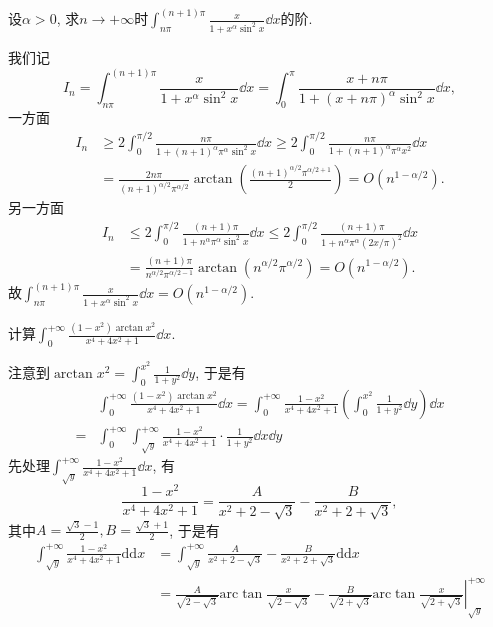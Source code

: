 \begin{quizb}
\woe 设\(\alpha>0\), 求\(n\rightarrow+\infty\)时\(\int_{n\pi}^{(n+1)\pi}\frac{x}{1+x^\alpha\sin^2x}\dd x\)的阶.
\begin{solution}
我们记\[I_n=\int_{n\pi}^{(n+1)\pi}\frac{x}{1+x^\alpha\sin^2x}\dd x=\int_{0}^{\pi}\frac{x+n\pi}{1+(x+n\pi)^\alpha\sin^2x}\dd x,\]一方面\[\begin{split}
I_n&\geqslant 2\int_{0}^{\pi/2}\frac{n\pi}{1+(n+1)^\alpha\pi^\alpha\sin^2x}\dd x\geqslant 2\int_{0}^{\pi/2}\frac{n\pi}{1+(n+1)^\alpha\pi^\alpha x^2}\dd x\\&=\frac{2n\pi}{(n+1)^{\alpha/2}\pi^{\alpha/2}}\arctan\left(\frac{(n+1)^{\alpha/2}\pi^{\alpha/2+1}}{2}\right)=O(n^{1-\alpha/2}).
\end{split}\]另一方面\[\begin{split}
I_n&\leqslant 2\int_{0}^{\pi/2}\frac{(n+1)\pi}{1+n^\alpha\pi^{\alpha}\sin^2x}\dd x\leqslant 2\int_{0}^{\pi/2}\frac{(n+1)\pi}{1+n^{\alpha}\pi^{\alpha}(2x/\pi)^2}\dd x\\
&=\frac{(n+1)\pi}{n^{\alpha/2}\pi^{\alpha/2-1}}\arctan(n^{\alpha/2}\pi^{\alpha/2})=O(n^{1-\alpha/2}).\end{split}\]
故\(\int_{n\pi}^{(n+1)\pi}\frac{x}{1+x^\alpha\sin^2x}\dd x=O(n^{1-\alpha/2})\).
\end{solution}
\woe 计算\(\int_{0}^{+\infty}\frac{(1-x^2)\arctan x^2}{x^4+4x^2+1}\dd x.\)
\begin{solution}
注意到\(\arctan x^2=\int_{0}^{x^2}\frac{1}{1+y^2}\dd y\), 于是有\[\begin{split}
&\int_{0}^{+\infty}\frac{(1-x^2)\arctan x^2}{x^4+4x^2+1}\dd x=\int_{0}^{+\infty}\frac{1-x^2}{x^4+4x^2+1}\left(\int_{0}^{x^2}\frac{1}{1+y^2}\dd y\right)\dd x\\=&\int_{0}^{+\infty}\int_{\sqrt{y}}^{+\infty}\frac{1-x^2}{x^4+4x^2+1}\cdot\frac{1}{1+y^2}\dd x\dd y
\end{split}\]
先处理\(\int_{\sqrt{y}}^{+\infty}\frac{1-x^2}{x^4+4x^2+1}\dd x\), 有\[\frac{1-x^2}{x^4+4x^2+1}=\frac{A}{x^2+2-\sqrt{3}}-\frac{B}{x^2+2+\sqrt{3}},\]其中\(A=\frac{\sqrt{3}-1}{2},B=\frac{\sqrt{3}+1}{2}\), 于是有
\[\begin{aligned}
	\int_{\sqrt{y}}^{+\infty}{\frac{1-x^2}{x^4+4x^2+1}}\mathrm{dd}x&=\int_{\sqrt{y}}^{+\infty}{\frac{A}{x^2+2-\sqrt{3}}}-\frac{B}{x^2+2+\sqrt{3}}\mathrm{dd}x\\
	&=\left.\frac{A}{\sqrt{2-\sqrt{3}}}\mathrm{arc}\tan \frac{x}{\sqrt{2-\sqrt{3}}}-\frac{B}{\sqrt{2+\sqrt{3}}}\mathrm{arc}\tan \frac{x}{\sqrt{2+\sqrt{3}}}\right|_{\sqrt{y}}^{+\infty}\\

\end{aligned}\]
\end{solution}
\end{quizb}

